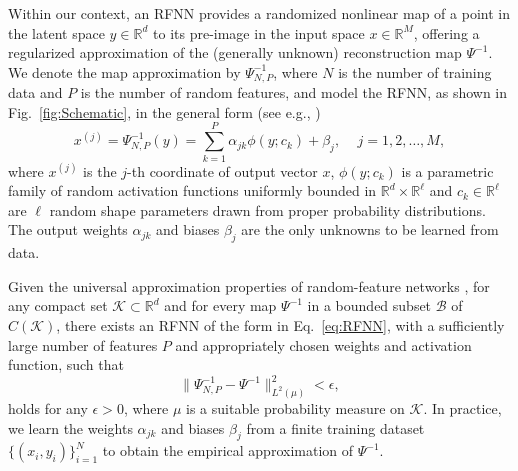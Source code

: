\documentclass{article}
\begin{document}

Within our context, an RFNN provides a randomized nonlinear map of a point in the latent space $y\in \mathbb{R}^d$ to its pre-image in the input space $x\in \mathbb{R}^M$, offering a regularized approximation of the (generally unknown) reconstruction map $\Psi^{-1}$. We denote the map approximation by $\Psi_{N,P}^{-1}$, where $N$ is the number of training data and $P$ is the number of random features, and model the RFNN, as shown in Fig.~\ref{fig:Schematic}, in the general form (see e.g., \cite{lowe1988multivariable})  
\begin{equation}
x^{(j)} = \Psi^{-1}_{N,P}(y)= \sum_{k=1}^{P} \alpha_{jk}%
\phi(y; c_k) + \beta_j%
, \quad \, j=1,2,\dots, M,
\label{eq:RFNN}
\end{equation}
where $x^{(j)}$ is the $j$-th coordinate of output vector $x$, $\phi(y; c_k)$ is a parametric family of random activation functions uniformly bounded in $\mathbb{R}^{d} \times \mathbb{R}^{\ell}$ and $c_k \in \mathbb{R}^{\ell}$ are $\ell$ random shape parameters drawn from proper probability distributions. The output weights $\alpha_{jk}$ and biases $\beta_j$ are the only unknowns to be learned from data. 

Given the universal approximation properties of random-feature networks \cite{igelnik1995stochastic,rahimi2007random,rahimi2008uniform,gorban2016approximation,fabiani2025randonets,fabiani2025random}, for any compact set $\mathcal{K} \subset \mathbb{R}^d$ and for every map $\Psi^{-1}$ in a bounded subset $\mathcal{B}$ of $C(\mathcal{K})$, there exists an RFNN of the form in Eq.~\eqref{eq:RFNN}, with a sufficiently large number of features $P$ and appropriately chosen weights and activation function, such that 
\begin{equation}
\big\| {\Psi^{-1}_{N,P}} - \Psi^{-1} \big\|^2_{L^2(\mu)}<\epsilon,
\label{eq:RFNNapprox}
\end{equation}
holds for any $\epsilon>0$, where $\mu$ is a suitable probability measure on $\mathcal{K}$. In practice, we learn the weights $\alpha_{jk}$ and biases $\beta_j$ from a finite training dataset $\{(x_i,y_i)\}_{i=1}^N$ to obtain the empirical approximation of $\Psi^{-1}$.
\end{document}
